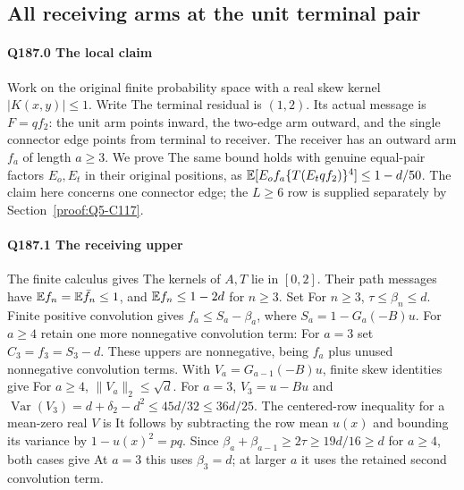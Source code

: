 \subsection{All receiving arms at the unit terminal pair}\label{proof:Q5-C187}
\paragraph{Q187.0 The local claim}
Work on the original finite probability space with a real skew kernel
$|K(x,y)|\le1$. Write
The terminal residual is $(1,2)$. Its actual message is $F=qf_2$:
the unit arm points inward, the two-edge arm outward, and the
single connector edge points from terminal to receiver. The receiver
has an outward arm $f_a$ of length $a\ge3$. We prove
The same bound holds with genuine equal-pair factors $E_o,E_t$
in their original positions, as
$\mathbb E[E_of_a\{T(E_tqf_2)\}^4]\le1-d/50$.
The claim here concerns
one connector edge; the $L\ge6$ row is supplied separately by
Section~\ref{proof:Q5-C117}.

\paragraph{Q187.1 The receiving upper}
The finite calculus gives
The kernels of $A,T$ lie in $[0,2]$. Their path messages have
$\mathbb E f_n=\mathbb E\bar f_n\le1$, and $\mathbb E f_n\le1-2d$ for $n\ge3$.
Set
For $n\ge3$, $\tau\le\beta_n\le d$. Finite positive convolution
gives $f_a\le S_a-\beta_a$, where $S_a=1-G_a(-B)u$.
For $a\ge4$ retain one more nonnegative convolution term:
For $a=3$ set $C_3=f_3=S_3-d$. These uppers are nonnegative,
being $f_a$ plus unused nonnegative convolution terms.
With $V_a=G_{a-1}(-B)u$, finite skew identities give
For $a\ge4$, $\|V_a\|_2\le\sqrt d$. For $a=3$,
$V_3=u-Bu$ and
$\operatorname{Var}(V_3)=d+\delta_2-d^2\le45d/32\le36d/25$.
The centered-row inequality for a mean-zero real $V$ is
It follows by subtracting the row mean $u(x)$ and bounding its
variance by $1-u(x)^2=pq$. Since
$\beta_a+\beta_{a-1}\ge2\tau\ge19d/16\ge d$ for $a\ge4$,
both cases give
At $a=3$ this uses $\beta_3=d$; at larger $a$ it uses the retained
second convolution term.

